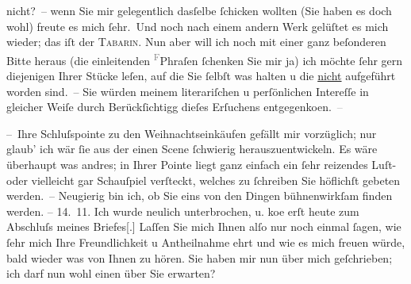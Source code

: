                nicht? – wenn Sie mir gelegentlich dasſelbe{ }ſchicken wollten (Sie haben es doch wohl)
               freute es mich{ }ſehr. Und noch nach einem andern Werk gelüſtet es mich wieder; das iſt
               der \textsc{Tabarin}. Nun aber will ich noch mit einer ganz beſonderen Bitte heraus (die {\pb}einleitenden \substVorne{}\textsuperscript{\textcolor{gray}{F}}\substDazwischen{}P\substHinten{}hraſen{ }ſchenken Sie mir ja) ich möchte{ }ſehr gern diejenigen Ihrer Stücke
               leſen, auf die Sie{ }ſelbſt was halten u die \uline{nicht}
               aufgeführt worden sind. – Sie würden meinem literariſchen u perſönlichen Intereſſe in
               gleicher Weiſe durch Berückſichtigg dieſes Erſuchens entgegenko{\geminationm}en. \textcolor{gray}{–}\pend
           
\pstart
           – Ihre Schluſspointe zu den Weihnachtseinkäufen
               gefällt mir vorzüglich; nur glaub’ ich wär{ }ſie aus der einen Scene{ }ſchwierig
               herauszuentwickeln. Es wäre überhaupt {\pb}was andres; in Ihrer
               Pointe liegt ganz einfach ein{ }ſehr reizendes Luſt- oder vielleicht gar Schauſpiel
               verſteckt, welches zu{ }ſchreiben Sie höflichſt gebeten werden. – Neugierig bin ich, ob
               Sie eins von den Dingen bühnenwirkſam finden werden. –\pend
           \vspace{1em}
\pstart
           \raggedleft{}14. 11.\pend
           \vspace{0.5em}
\pstart
           Ich wurde neulich unterbrochen, u. ko{\geminationm}e erſt heute zum
               Abschluſs meines Briefes{[}.{]} Laſſen Sie mich Ihnen alſo nur noch
               einmal{ }ſagen, wie{ }ſehr mich Ihre Freundlichkeit u Antheil{\pb}nahme ehrt und wie es mich freuen würde, bald wieder was von Ihnen zu hören. Sie
               haben mir nun \label{K_L03941-6v}\label{K_L03941-6} über
               mich geſchrieben; ich darf nun wohl einen über Sie erwarten?\pend
           
